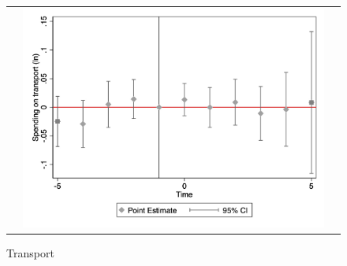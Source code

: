 \begin{figure}[ht]
\begin{tabular}{@{}ccc@{}}
\begin{minipage}[t]{0.32\textwidth}
            \label{fig:cassport}
        \end{minipage} &
        \begin{minipage}[t]{0.32\textwidth}
            \centering
            \caption{Transport}
            \includegraphics[width=\linewidth]{images/total population/caseventdd_ln_q4_08_step1.jpg}
            \label{fig:castransport}
        \end{minipage} \\[10pt]


\end{tabular}
\end{figure}

